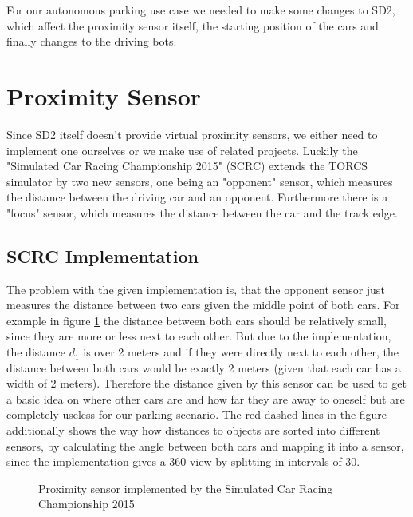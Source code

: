 \documentclass[paper=a4, fontsize=11pt]{scrreprt}
\begin{document}
For our autonomous parking use case we needed to make some changes to SD2,
which affect the proximity sensor itself, the starting position of the cars
and finally changes to the driving bots.

\section{Proximity Sensor}
Since SD2 itself doesn't provide virtual proximity sensors,
we either need to implement one ourselves or we make use of related projects.
Luckily the "Simulated Car Racing Championship 2015" (SCRC) \cite{scrc2015} extends the TORCS simulator by two new sensors,
one being an "opponent" sensor, which measures the distance between the driving car and an opponent.
Furthermore there is a "focus" sensor, which measures the distance between the car and the track edge.

\subsection{SCRC Implementation}
The problem with the given implementation is,
that the opponent sensor just measures the distance between two cars given the middle point of both cars.
For example in figure \ref{aw_scrc_impl} the distance between both cars should be relatively small,
since they are more or less next to each other.
But due to the implementation, the distance $d_1$ is over 2 meters and if they were directly next to each other,
the distance between both cars would be exactly 2 meters (given that each car has a width of 2 meters).
Therefore the distance given by this sensor can be used to get a basic idea on where other cars are
and how far they are away to oneself but are completely useless for our parking scenario.
The red dashed lines in the figure additionally shows the way how distances to objects are sorted into different sensors,
by calculating the angle between both cars and mapping it into a sensor,
since the implementation gives a 360\degree{} view by splitting in intervals of 30\degree{}.

\begin{figure}
\begin{center}
\end{center}
\caption{Proximity sensor implemented by the Simulated Car Racing Championship 2015}\label{aw_scrc_impl}
\end{figure}
\end{document}
